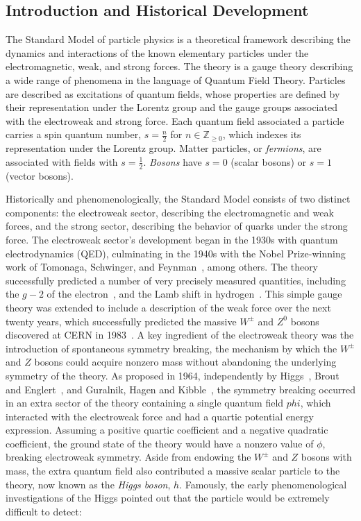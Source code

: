 \subsection{Introduction and Historical Development}
The Standard Model of particle physics is a theoretical framework describing the dynamics and interactions of the known elementary particles under the electromagnetic, weak, and strong forces. The theory is a gauge theory describing a wide range of phenomena in the language of Quantum Field Theory. Particles are described as excitations of quantum fields, whose properties are defined by their representation under the Lorentz group and the gauge groups associated with the electroweak and strong force. Each quantum field associated a particle carries a spin quantum number, $s=\frac{n}{2}$ for $n\in \mathbb{Z}_{\geq0}$, which indexes its representation under the Lorentz group. Matter particles, or \emph{fermions}, are associated with fields with $s=\frac12$. \emph{Bosons} have $s=0$ (scalar bosons) or $s=1$ (vector bosons). 


Historically and phenomenologically, the Standard Model consists of two distinct components: the electroweak sector, describing the electromagnetic and weak forces, and the strong sector, describing the behavior of quarks under the strong force. The electroweak sector's development began in the 1930s with quantum electrodynamics (QED), culminating in the 1940s with the Nobel Prize-winning work of Tomonaga, Schwinger, and Feynman~\cite{QED}, among others. The theory successfully predicted a number of very precisely measured quantities, including the $g-2$ of the electron~\cite{g-2}, and the Lamb shift in hydrogen~\cite{bethe-lamb}. This simple gauge theory was extended to include a description of the weak force over the next twenty years, which successfully predicted the massive $W^{\pm}$ and $Z^0$ bosons discovered at CERN in 1983~\cite{WZ-discovery}. A key ingredient of the electroweak theory was the introduction of spontaneous symmetry breaking, the mechanism by which the $W^{\pm}$ and $Z$ bosons could acquire nonzero mass without abandoning the underlying symmetry of the theory. As proposed in 1964, independently by Higgs~\cite{higgs}, Brout and Englert~\cite{brout englert}, and Guralnik, Hagen and Kibble~\cite{ghk}, the symmetry breaking occurred in an extra sector of the theory containing a single quantum field $phi$, which interacted with the electroweak force and had a quartic potential energy expression. Assuming a positive quartic coefficient and a negative quadratic coefficient, the ground state of the theory would have a nonzero value of $\phi$, breaking electroweak symmetry. Aside from endowing the $W^{\pm}$ and $Z$ bosons with mass, the extra quantum field also contributed a massive scalar particle to the theory, now known as the \emph{Higgs boson}, $h$. Famously, the early phenomenological investigations of the Higgs pointed out that the particle would be extremely difficult to detect:

